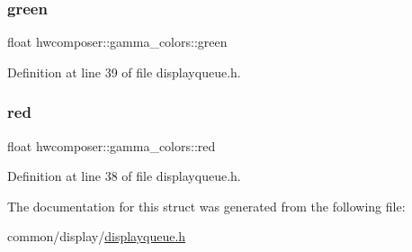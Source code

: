 \mbox{\label{structhwcomposer_1_1gamma__colors_a920b8cb1cd029474bbbcbfae61d0feb2}} 
\subsubsection{\texorpdfstring{green}{green}}
{\footnotesize\ttfamily float hwcomposer\+::gamma\+\_\+colors\+::green}



Definition at line 39 of file displayqueue.\+h.

\mbox{\label{structhwcomposer_1_1gamma__colors_a02c6848074b1bf52bedf0a97a791fbbd}} 
\subsubsection{\texorpdfstring{red}{red}}
{\footnotesize\ttfamily float hwcomposer\+::gamma\+\_\+colors\+::red}



Definition at line 38 of file displayqueue.\+h.



The documentation for this struct was generated from the following file\+:\begin{DoxyCompactItemize}
\item 
common/display/\mbox{\hyperlink{displayqueue_8h}{displayqueue.\+h}}\end{DoxyCompactItemize}
